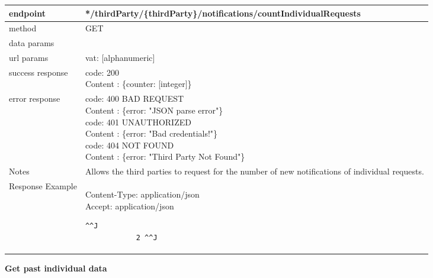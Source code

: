 	\begin{tabularx}{\linewidth}{| l| l }
		\hline
		endpoint & */thirdParty/\{thirdParty\}/notifications/countIndividualRequests \\
		\hline
		method & GET \\
		\hline
		data params & \\
		\hline
		url params &
		\parbox{0.7\textwidth}{
			\bigskip
			vat: [alphanumeric]
			\bigskip
		} \\
		\hline
		success response &
		\parbox{0.7\textwidth}{
			\bigskip
			code: 200\\
			Content : \{counter: [integer]\}
			\bigskip
		} \\
		\hline
		error response &
		\parbox{0.7\textwidth}{
			\bigskip
			code: 400 BAD REQUEST \\
			Content : \{error: "JSON parse error"\}\\
			code: 401 UNAUTHORIZED \\
			Content : \{error: "Bad credentials!"\}\\
			code: 404 NOT FOUND \\
			Content : \{error: "Third Party Not Found"\}
			\bigskip
		} \\
		\hline
		Notes & 
		\parbox{0.7\textwidth}{
			\bigskip Allows the third parties to request for the number of new notifications of individual requests.
		\bigskip}  \\
		\hline
		Response Example & 
		\parbox{0.8\textwidth}{
		\bigskip
		Content-Type: application/json \\
		Accept: application/json \\
		\begin{lstlisting}^^J
			2 ^^J
		\end{lstlisting}
	} \\
	\hline
	\end{tabularx}
	
	\textbf{Get past individual data} \\

